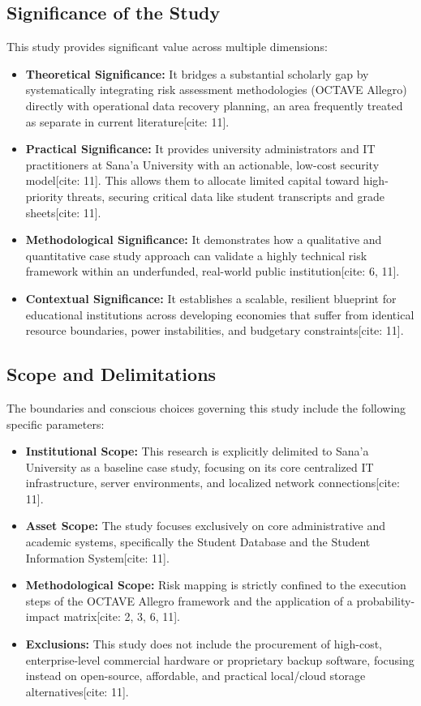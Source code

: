 \documentclass[journal,onecolumn,12pt,twoside]{IEEEtran}
\begin{document}
	\subsection{Significance of the Study}
	\label{subsec:significance}
	This study provides significant value across multiple dimensions:
	\begin{itemize}
		\item \textbf{Theoretical Significance:} It bridges a substantial scholarly gap by systematically integrating risk assessment methodologies (OCTAVE Allegro) directly with operational data recovery planning, an area frequently treated as separate in current literature[cite: 11].
		\item \textbf{Practical Significance:} It provides university administrators and IT practitioners at Sana'a University with an actionable, low-cost security model[cite: 11]. This allows them to allocate limited capital toward high-priority threats, securing critical data like student transcripts and grade sheets[cite: 11].
		\item \textbf{Methodological Significance:} It demonstrates how a qualitative and quantitative case study approach can validate a highly technical risk framework within an underfunded, real-world public institution[cite: 6, 11].
		\item \textbf{Contextual Significance:} It establishes a scalable, resilient blueprint for educational institutions across developing economies that suffer from identical resource boundaries, power instabilities, and budgetary constraints[cite: 11].
	\end{itemize}
	
	\subsection{Scope and Delimitations}
	\label{subsec:scope}
	The boundaries and conscious choices governing this study include the following specific parameters:
	\begin{itemize}
		\item \textbf{Institutional Scope:} This research is explicitly delimited to Sana'a University as a baseline case study, focusing on its core centralized IT infrastructure, server environments, and localized network connections[cite: 11].
		\item \textbf{Asset Scope:} The study focuses exclusively on core administrative and academic systems, specifically the Student Database and the Student Information System[cite: 11].
		\item \textbf{Methodological Scope:} Risk mapping is strictly confined to the execution steps of the OCTAVE Allegro framework and the application of a probability-impact matrix[cite: 2, 3, 6, 11].
		\item \textbf{Exclusions:} This study does not include the procurement of high-cost, enterprise-level commercial hardware or proprietary backup software, focusing instead on open-source, affordable, and practical local/cloud storage alternatives[cite: 11].
	\end{itemize}
	
\end{document}
